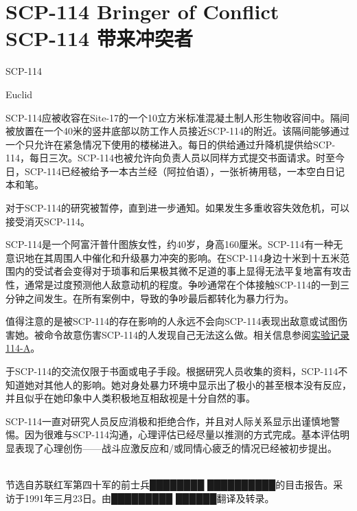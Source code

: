 \chapter[SCP-114 带来冲突者]{
    SCP-114 Bringer of Conflict\\
    SCP-114 带来冲突者
}

\label{chap:SCP-114}

SCP-114

Euclid

SCP-114应被收容在Site-17的一个10立方米标准混凝土制人形生物收容间中。隔间被放置在一个40米的竖井底部以防工作人员接近SCP-114的附近。该隔间能够通过一个只允许在紧急情况下使用的楼梯进入。每日的供给通过升降机提供给SCP-114，每日三次。SCP-114也被允许向负责人员以同样方式提交书面请求。时至今日，SCP-114已经被给予一本古兰经（阿拉伯语），一张祈祷用毯，一本空白日记本和笔。

对于SCP-114的研究被暂停，直到进一步通知。如果发生多重收容失效危机，可以接受消灭SCP-114。

SCP-114是一个阿富汗普什图族女性，约40岁，身高160厘米。SCP-114有一种无意识地在其周围人中催化和升级暴力冲突的影响。在SCP-114身边十米到十五米范围内的受试者会变得对于琐事和后果极其微不足道的事上显得无法平复地富有攻击性，通常是过度预测他人敌意动机的程度。争吵通常在个体接触SCP-114的一到三分钟之间发生。在所有案例中，导致的争吵最后都转化为暴力行为。

值得注意的是被SCP-114的存在影响的人永远不会向SCP-114表现出敌意或试图伤害她。被命令故意伤害SCP-114的人发现自己无法这么做。相关信息参阅\hyperref[sec:DOC-experiment-log-114-a]{实验记录114-A}。

于SCP-114的交流仅限于书面或电子手段。根据研究人员收集的资料，SCP-114不知道她对其他人的影响。她对身处暴力环境中显示出了极小的甚至根本没有反应，并且似乎在她印象中人类积极地互相敌视是十分自然的事。

SCP-114一直对研究人员反应消极和拒绝合作，并且对人际关系显示出谨慎地警惕。因为很难与SCP-114沟通，心理评估已经尽量以推测的方式完成。基本评估明显表现了心理创伤——战斗应激反应和\slash 或同情心疲乏的情况已经被初步提出。

\\
节选自苏联红军第四十军的前士兵████████ ██████████的目击报告。采访于1991年三月23日。由█████████ ██████翻译及转录。

